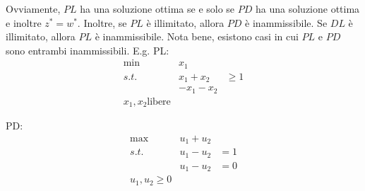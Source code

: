 \documentclass[12pt]{article}
\begin{document}
Ovviamente, $PL$ ha una soluzione ottima se e solo se $PD$ ha una soluzione
ottima e inoltre $z^* = w^*$. Inoltre, se $PL$ è illimitato, allora $PD$ è
inammissibile. Se $DL$ è illimitato, allora $PL$ è inammissibile. Nota bene,
esistono casi in cui $PL$ e $PD$ sono entrambi inammissibili. E.g. PL:
\begin{align*}
	\min \quad & x_1                \\
	s.t. \quad & x_1 + x_2 & \geq 1 \\
	           & -x_1 -x_2 &        \\
	x_1, x_2 \text{libere}
\end{align*}

PD:
\begin{align*}
	\max \quad & u_1 + u_2       \\
	s.t. \quad & u_1 - u_2 & = 1 \\
	           & u_1 - u_2 & = 0 \\
	u_1, u_2 \geq 0
\end{align*}
\end{document}
